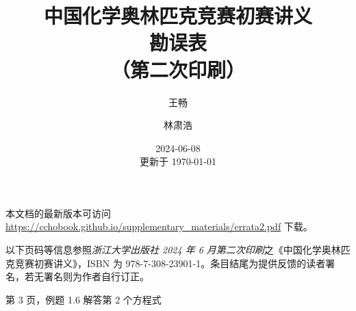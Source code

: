 \documentclass{errata}
\title{中国化学奥林匹克竞赛初赛讲义 \\ {\bfseries 勘误表} \\ （第二次印刷）}
\author{王畅 \and 林肃浩}
\date{2024-06-08 \\ 更新于 \today}
\begin{document}
    \maketitle
    本文档的最新版本可访问 \url{https://cchobook.github.io/supplementary_materials/errata2.pdf} 下载。

    以下页码等信息参照\emph{浙江大学出版社 2024 年 6 月第二次印刷}之《中国化学奥林匹克竞赛初赛讲义》，ISBN 为 978-7-308-23901-1。条目结尾为提供反馈的读者署名，若无署名则为作者自行订正。

    \begin{Errata}
        \item[第 3 页，例题 1.6 解答第 2 个方程式]
            \Orig {}
            \Corr {}
    \end{Errata}

    \renewcommand{\em}{\itshape}
    \renewcommand*{\bibfont}{\footnotesize}
    \renewcommand{\refname}{参考文献}
    \renewcommand{\bibname}{参考文献}
    \printbibliography
\end{document}
